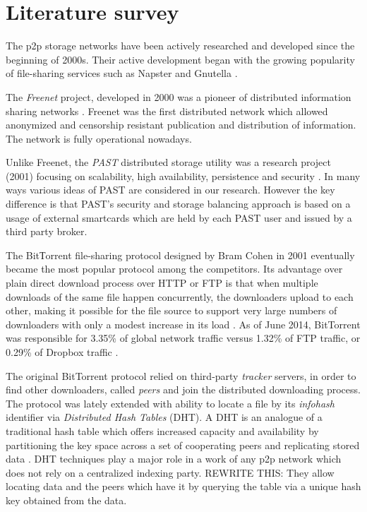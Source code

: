 \section{Literature survey}

The p2p storage networks have been actively researched and developed since
the beginning of 2000s. Their active development began with the growing
popularity of file-sharing services such as Napster \cite{napster}
and Gnutella \cite{gnutella}.

The \emph{Freenet} project, developed in 2000 was
a pioneer of distributed information sharing networks \cite{freenet}.
Freenet was the first distributed network which allowed anonymized
and censorship resistant publication and distribution of information.
The network is fully operational nowadays.

Unlike Freenet, the \emph{PAST} distributed storage utility was a
research project (2001) focusing on scalability, high availability, persistence
and security \cite{past}. In many ways various ideas of PAST are
considered in our research. However the key difference is that PAST's
security and storage balancing approach is based on a usage of external
smartcards which are held by each PAST user and issued by a third
party broker.

The BitТorrent file-sharing protocol designed by Bram Cohen
in 2001 \cite{wiki:bittorrent} eventually became the most
popular protocol among the competitors.
Its advantage over plain direct download process over HTTP or FTP
is that when multiple downloads of the same file happen concurrently,
the downloaders upload to each other, making it possible for the file
source to support very large numbers of downloaders with only a modest
increase in its load \cite{bep3}.
As of June 2014, BitTorrent was responsible for 3.35\% of global
network traffic versus 1.32\% of FTP traffic, or 0.29\% of
Dropbox traffic \cite{paloalto-traffic}.

The original BitTorrent protocol relied on third-party \emph{tracker}
servers, in order to find other downloaders, called \emph{peers} and
join the distributed downloading process.
The protocol was lately extended with ability to locate a file by
its \emph{infohash} identifier via \emph{Distributed Hash Tables} (DHT).
A DHT is an analogue of a traditional hash table which offers increased
capacity and availability by partitioning the key space across a set
of cooperating peers and replicating stored data \cite{opendht}.
DHT techniques play a major role in a work of any p2p network
which does not rely on a centralized indexing party.
REWRITE THIS: They allow locating data and the peers which have it by querying
the table via a unique hash key obtained from the data.


